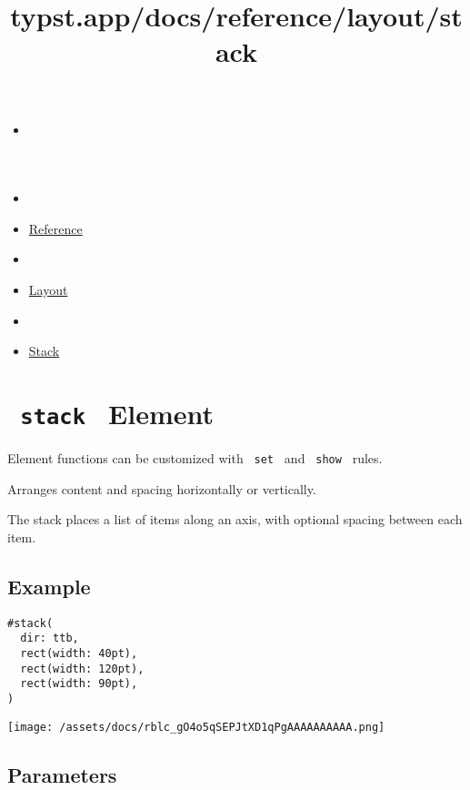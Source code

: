 \title{typst.app/docs/reference/layout/stack}

\begin{itemize}
\tightlist
\item
  \href{/docs}{}
\item
  
\item
  \href{/docs/reference/}{Reference}
\item
  
\item
  \href{/docs/reference/layout/}{Layout}
\item
  
\item
  \href{/docs/reference/layout/stack/}{Stack}
\end{itemize}

\section{\texorpdfstring{\texttt{\ stack\ } {{ Element
}}}{ stack   Element }}\label{summary}

\label{element-tooltip}
Element functions can be customized with \texttt{\ set\ } and
\texttt{\ show\ } rules.

Arranges content and spacing horizontally or vertically.

The stack places a list of items along an axis, with optional spacing
between each item.

\subsection{Example}\label{example}

\begin{verbatim}
#stack(
  dir: ttb,
  rect(width: 40pt),
  rect(width: 120pt),
  rect(width: 90pt),
)
\end{verbatim}

\texttt{[image: /assets/docs/rblc\_gO4o5qSEPJtXD1qPgAAAAAAAAAA.png]}

\subsection{\texorpdfstring{{ Parameters
}}{ Parameters }}\label{parameters}

